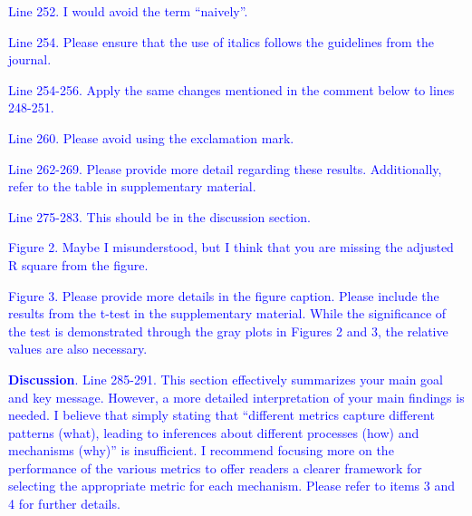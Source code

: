 \documentclass[
]{article}
\begin{document}
\textcolor{blue}{Line 252. I would avoid the term ``naively''.}

\textcolor{blue}{Line 254. Please ensure that the use of italics follows the guidelines from the journal.}

\textcolor{blue}{Line 254-256. Apply the same changes mentioned in the comment below to lines 248-251.}

\textcolor{blue}{Line 260. Please avoid using the exclamation mark.}

\textcolor{blue}{Line 262-269. Please provide more detail regarding these results. Additionally, refer to the table in supplementary material.}

\textcolor{blue}{Line 275-283. This should be in the discussion section.}

\textcolor{blue}{Figure 2. Maybe I misunderstood, but I think that you are missing the adjusted R square from the figure.}


\textcolor{blue}{Figure 3. Please provide more details in the figure caption. Please include the results from the t-test in the supplementary material.
While the significance of the test is demonstrated through the gray plots in Figures 2 and 3, the relative values are also necessary.}

\textcolor{blue}{\textbf{Discussion}.}
\textcolor{blue}{Line 285-291. This section effectively summarizes your main goal and key message.
However, a more detailed interpretation of your main findings is needed.
I believe that simply stating that ``different metrics capture different patterns (what), leading to inferences about different processes (how) and mechanisms (why)'' is insufficient.
I recommend focusing more on the performance of the various metrics to offer readers a clearer framework for selecting the appropriate metric for each mechanism.
Please refer to items 3 and 4 for further details.}
\end{document}
